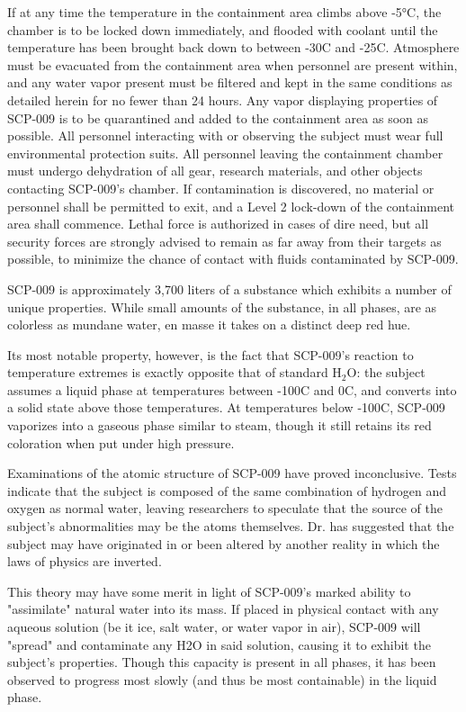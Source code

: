 If at any time the temperature in the containment area climbs above -5°C, the chamber is to be locked down immediately, and flooded with coolant until the temperature has been brought back down to between -30\degree C and -25\degree C. Atmosphere must be evacuated from the containment area when personnel are present within, and any water vapor present must be filtered and kept in the same conditions as detailed herein for no fewer than 24 hours. Any vapor displaying properties of SCP-009 is to be quarantined and added to the containment area as soon as possible.
\newpage
All personnel interacting with or observing the subject must wear full environmental protection suits. All personnel leaving the containment chamber must undergo dehydration of all gear, research materials, and other objects contacting SCP-009's chamber. If contamination is discovered, no material or personnel shall be permitted to exit, and a Level 2 lock-down of the containment area shall commence. Lethal force is authorized in cases of dire need, but all security forces are strongly advised to remain as far away from their targets as possible, to minimize the chance of contact with fluids contaminated by SCP-009.

 SCP-009 is approximately 3,700 liters of a substance which exhibits a number of unique properties. While small amounts of the substance, in all phases, are as colorless as mundane water, en masse it takes on a distinct deep red hue.

Its most notable property, however, is the fact that SCP-009's reaction to temperature extremes is exactly opposite that of standard H$_{2}$O: the subject assumes a liquid phase at temperatures between -100\degree C and 0\degree C, and converts into a solid state above those temperatures. At temperatures below -100\degree C, SCP-009 vaporizes into a gaseous phase similar to steam, though it still retains its red coloration when put under high pressure.

Examinations of the atomic structure of SCP-009 have proved inconclusive. Tests indicate that the subject is composed of the same combination of hydrogen and oxygen as normal water, leaving researchers to speculate that the source of the subject's abnormalities may be the atoms themselves. Dr.  has suggested that the subject may have originated in or been altered by another reality in which the laws of physics are inverted.

This theory may have some merit in light of SCP-009's marked ability to "assimilate" natural water into its mass. If placed in physical contact with any aqueous solution (be it ice, salt water, or water vapor in air), SCP-009 will "spread" and contaminate any H2O in said solution, causing it to exhibit the subject's properties. Though this capacity is present in all phases, it has been observed to progress most slowly (and thus be most containable) in the liquid phase.

